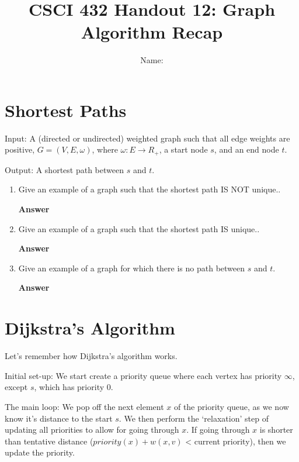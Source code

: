 \documentclass{article}
\title{CSCI 432 Handout 12: Graph Algorithm Recap}
\author{Name: \rule{3in}{0.15mm}}
\begin{document}
\maketitle

\section*{Shortest Paths}

Input: A (directed or undirected)
weighted graph such that all edge weights are positive,
$G=(V,E,\omega)$, where $\omega \colon E \to R_{+}$, a start node $s$, and an
end node $t$.

Output: A shortest path between $s$ and $t$.

\begin{enumerate}
    \item Give an example of a graph such that the shortest path IS NOT unique..

        \textbf{Answer}
        \vspace{1in}

    \item Give an example of a graph such that the shortest path IS unique..

        \textbf{Answer}
        \vspace{1in}

    \item Give an example of a graph for which there is no path between $s$ and
        $t$.

        \textbf{Answer}
        \vspace{1in}

\end{enumerate}

\newpage
\section*{Dijkstra's Algorithm}

Let's remember how Dijkstra's algorithm works.

Initial set-up: We start create a priority queue where each vertex has priority
$\infty$, except $s$, which has priority $0$.

The main loop: We pop off the next element $x$ of the priority queue, as we now
know it's distance to the start $s$. We then perform the `relaxation' step of
updating all priorities to allow for going through $x$. If going through $x$ is
shorter than tentative distance ($priority(x)+w(x,v)$ < current priority), then
we update the priority.
\end{document}
